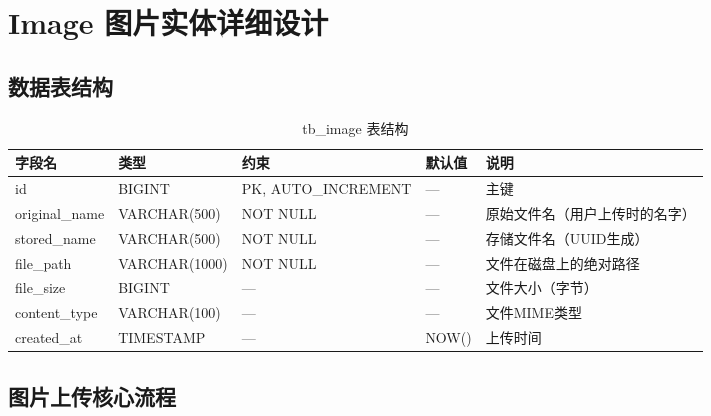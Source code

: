 \section{Image 图片实体详细设计}

\subsection{数据表结构}

\begin{table}[htbp]
\centering
\caption{tb\_image 表结构}
\label{tab:tb_image}
\begin{tabular}{lllll}
\toprule
\textbf{字段名} & \textbf{类型} & \textbf{约束} & \textbf{默认值} & \textbf{说明} \\
\midrule
id            & BIGINT    & PK, AUTO\_INCREMENT & —      & 主键 \\
original\_name & VARCHAR(500) & NOT NULL        & —      & 原始文件名（用户上传时的名字）\\
stored\_name   & VARCHAR(500) & NOT NULL        & —      & 存储文件名（UUID生成）\\
file\_path     & VARCHAR(1000)& NOT NULL        & —      & 文件在磁盘上的绝对路径 \\
file\_size     & BIGINT    & —                & —      & 文件大小（字节）\\
content\_type  & VARCHAR(100) & —                & —      & 文件MIME类型 \\
created\_at    & TIMESTAMP & —                & NOW()  & 上传时间 \\
\bottomrule
\end{tabular}
\end{table}

\subsection{图片上传核心流程}

